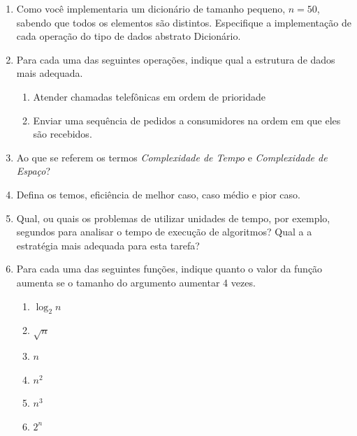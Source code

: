 \documentclass{article}
\begin{document}
\begin{enumerate}
    \item Como você implementaria um dicionário de tamanho pequeno, $n=50$, sabendo que todos os elementos são distintos. Especifique a implementação de cada operação do tipo de dados abstrato Dicionário. %

    \item Para cada uma das seguintes operações, indique qual a estrutura de dados mais adequada.%
    \begin{enumerate}
        \item Atender chamadas telefônicas em ordem de prioridade
        \item Enviar uma sequência de pedidos a consumidores na ordem em que eles são recebidos.
    \end{enumerate}


    \item Ao que se referem os termos \textit{Complexidade de Tempo} e \textit{Complexidade de Espaço}?
    
    \item Defina os temos, eficiência de melhor caso, caso médio e pior caso.
    
    \item Qual, ou quais os problemas de utilizar unidades de tempo, por exemplo, segundos para analisar o tempo de execução de algoritmos? Qual a a estratégia mais adequada para esta tarefa?
    
    \item  Para cada uma das seguintes funções, indique quanto o valor da função aumenta se o tamanho do argumento aumentar 4 vezes.%

    
    \begin{enumerate}
        \item $\log_2n$
        \item $\sqrt{n}$
        \item $n$
        \item $n^2$
        \item $n^3$
        \item $2^n$
    \end{enumerate}
    

\end{enumerate}
\end{document}
